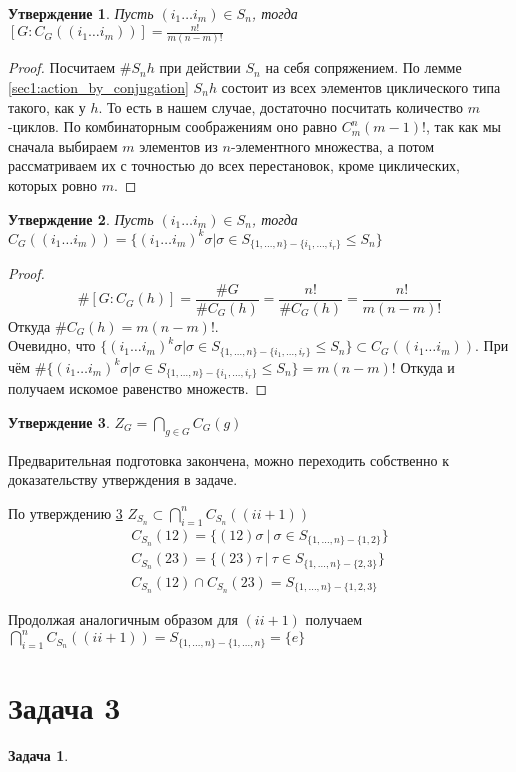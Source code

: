 \documentclass{article}
\newtheorem{task}{Задача}
\newtheorem{statement}{Утверждение}
\newcommand{\icycle}[3]{(#1_{#2} \dots #1_{#3})}
\newcommand{\range}[2]{\{#1, \dots, #2\}}
\newcommand{\irange}[3]{#1_{#2}, \dots, #1_{#3}}
\newcommand{\subgroup}{\leq}
\begin{document}
\begin{statement}
Пусть $\icycle{i}{1}{m} \in S_n$, тогда $[G: C_G(\icycle{i}{1}{m})] = \frac{n!}{m(n - m)!}$
\end{statement}

\begin{proof}
Посчитаем $\#S_{n}h$ при действии $S_n$ на себя сопряжением.
По лемме \ref{sec1:action_by_conjugation} $S_{n}h$ состоит из всех элементов циклического типа такого, как у $h$.
То есть в нашем случае, достаточно посчитать количество $m$-циклов.
По комбинаторным соображениям оно равно $C^{n}_{m} (m - 1)!$, 
так как мы сначала выбираем $m$ элементов из $n$-элементного множества, 
а потом рассматриваем их с точностью до всех перестановок, кроме циклических, которых ровно $m$.
\end{proof}

\begin{statement}
\label{sec2:cyclecentralizer}
Пусть $\icycle{i}{1}{m} \in S_n$, тогда $C_G(\icycle{i}{1}{m}) = \{\icycle{i}{1}{m}^k \sigma | \sigma \in S_{\range{1}{n} - \{\irange{i}{1}{r}\}} \subgroup S_n\}$
\end{statement}

\begin{proof}
    \begin{equation*}
        \#[G: C_G(h)] = \frac{\#G}{\#C_G(h)} = \frac{n!}{\#C_G(h)} = \frac{n!}{m(n - m)!}    
    \end{equation*}
Откуда $\#C_G(h) = m (n - m)!$. \\
Очевидно, что $\{\icycle{i}{1}{m}^k \sigma | \sigma \in S_{\range{1}{n} - \{\irange{i}{1}{r}\}} \subgroup S_n\} \subset C_G(\icycle{i}{1}{m})$.
При чём $\#\{\icycle{i}{1}{m}^k \sigma | \sigma \in S_{\range{1}{n} - \{\irange{i}{1}{r}\}} \subgroup S_n\} = m (n - m)!$
Откуда и получаем искомое равенство множеств.
\end{proof}

\begin{statement}
\label{sec2:center}
$Z_{G} = \bigcap_{g \in G}C_G(g)$
\end{statement}

Предварительная подготовка закончена, 
можно переходить собственно к доказательству утверждения в задаче. 

По утверждению \ref{sec2:center} $Z_{S_n} \subset \bigcap_{i = 1}^{n}C_{S_n}((i i+1))$
\begin{gather*}
    C_{S_n}(12) = \{(12) \sigma ~ | ~ \sigma \in S_{\range{1}{n} - \{1, 2\}}\} \\ 
    C_{S_n}(23) = \{(23) \tau ~ | ~ \tau \in S_{\range{1}{n} - \{2, 3\}}\} \\
    C_{S_n}(12) \cap C_{S_n}(23) = S_{\range{1}{n} - \{1, 2, 3\}}
\end{gather*}

Продолжая аналогичным образом для $(i i+1)$ получаем $\bigcap_{i = 1}^{n}C_{S_n}((i i+1)) = S_{\range{1}{n} - \range{1}{n}} = \{e\}$

\section*{Задача 3}

\begin{task}

\end{task}
\end{document}
